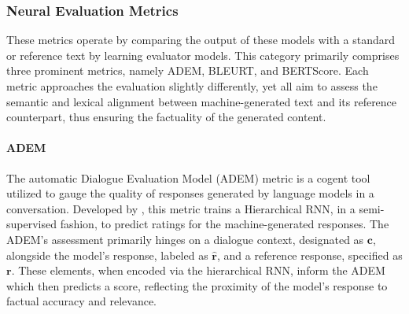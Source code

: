 \subsubsection{Neural  Evaluation Metrics}
These metrics operate by comparing the output of these models with a standard or reference text by learning evaluator models. This category primarily comprises three prominent metrics, namely ADEM, BLEURT, and BERTScore. Each metric approaches the evaluation slightly differently, yet all aim to assess the semantic and lexical alignment between machine-generated text and its reference counterpart, thus ensuring the factuality of the generated content.

\paragraph{ADEM}
The automatic Dialogue Evaluation Model (ADEM) metric is a cogent tool utilized to gauge the quality of responses generated by language models in a conversation. Developed by \citet{lowe2017towards}, this metric trains a Hierarchical RNN, in a semi-supervised fashion, to predict ratings for the machine-generated responses. The ADEM's assessment primarily hinges on a dialogue context, designated as $\mathbf{c}$, alongside the model's response, labeled as $\mathbf{\hat{r}}$, and a reference response, specified as $\mathbf{r}$. These elements, when encoded via the hierarchical RNN, inform the ADEM which then predicts a score, reflecting the proximity of the model's response to factual accuracy and relevance.





